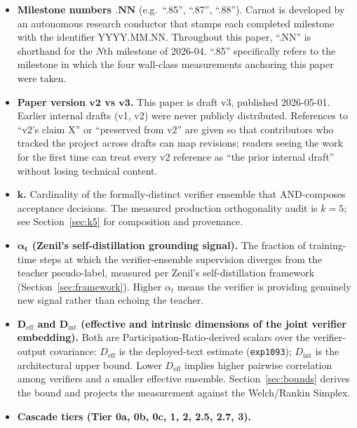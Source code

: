 \documentclass[10pt]{article}
\begin{document}
\begin{itemize}
  \item \textbf{Milestone numbers $\boldsymbol{.NN}$} (e.g.\ ``.85'',
    ``.87'', ``.88''). Carnot is developed by an autonomous research
    conductor that stamps each completed milestone with the
    identifier $\mathrm{YYYY}.\mathrm{MM}.\mathrm{NN}$. Throughout
    this paper, ``.NN'' is shorthand for the $N$th milestone of
    2026-04. ``.85'' specifically refers to the milestone in which
    the four wall-class measurements anchoring this paper were taken.
  \item \textbf{Paper version $\boldsymbol{v2}$ vs $\boldsymbol{v3}$.}
    This paper is draft v3, published 2026-05-01. Earlier internal
    drafts (v1, v2) were never publicly distributed. References to
    ``v2's claim X'' or ``preserved from v2'' are given so that
    contributors who tracked the project across drafts can map
    revisions; readers seeing the work for the first time can treat
    every v2 reference as ``the prior internal draft'' without losing
    technical content.
  \item \textbf{$\boldsymbol{k}$.} Cardinality of the formally-distinct
    verifier ensemble that AND-composes acceptance decisions. The
    measured production orthogonality audit is $k=5$; see
    Section~\ref{sec:k5} for composition and provenance.
  \item \textbf{$\boldsymbol{\alpha_t}$ (Zenil's self-distillation
    grounding signal).} The fraction of training-time steps at which
    the verifier-ensemble supervision diverges from the teacher
    pseudo-label, measured per Zenil's self-distillation framework
    (Section~\ref{sec:framework}). Higher $\alpha_t$ means the
    verifier is providing genuinely new signal rather than echoing
    the teacher.
  \item \textbf{$\boldsymbol{D_{\mathrm{eff}}}$ and
    $\boldsymbol{D_{\mathrm{int}}}$ (effective and intrinsic
    dimensions of the joint verifier embedding).} Both are
    Participation-Ratio-derived scalars over the verifier-output
    covariance: $D_{\mathrm{eff}}$ is the deployed-text estimate
    (\texttt{exp1093}); $D_{\mathrm{int}}$ is the architectural
    upper bound. Lower $D_{\mathrm{eff}}$ implies higher pairwise
    correlation among verifiers and a smaller effective ensemble.
    Section~\ref{sec:bounds} derives the bound and projects the
    measurement against the Welch/Rankin Simplex.
  \item \textbf{Cascade tiers (Tier 0a, 0b, 0c, 1, 2, 2.5, 2.7, 3).}

\end{itemize}
\end{document}
